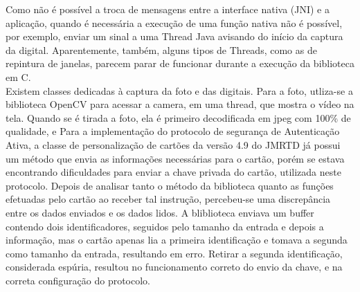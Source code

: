 \documentclass{article}
\begin{document}
\begin{justify}
		\hspace*{2cm}Como não é possível a troca de mensagens entre a interface nativa (JNI) e a aplicação, quando é necessária a execução de uma função nativa não é possível, por exemplo, enviar um sinal a uma Thread Java avisando do início da captura da digital. Aparentemente, também, alguns tipos de Threads, como as de repintura de janelas, parecem parar de funcionar durante a execução da biblioteca em C.\\
		\hspace*{2cm}Existem classes dedicadas à captura da foto e das digitais. Para a foto, utliza-se a biblioteca OpenCV para acessar a camera, em uma thread, que mostra o vídeo na tela. Quando se é tirada a foto, ela é primeiro decodificada em jpeg com 100\% de qualidade, e 
		\hspace*{2cm}Para a implementação do protocolo de segurança de Autenticação Ativa, a classe de personalização de cartões da versão 4.9 do JMRTD já possui um método que envia as informações necessárias para o cartão, porém se estava encontrando dificuldades para enviar a chave privada do cartão, utilizada neste protocolo. Depois de analisar tanto o método da biblioteca quanto as funções efetuadas pelo cartão ao receber tal instrução, percebeu-se uma discrepância entre os dados enviados e os dados lidos. A bliblioteca enviava um buffer contendo dois identificadores, seguidos pelo tamanho da entrada e depois a informação, mas o cartão apenas lia a primeira identificação e tomava a segunda como tamanho da entrada, resultando em erro. Retirar a segunda identificação, considerada espúria, resultou no funcionamento correto do envio da chave, e na correta configuração do protocolo.


		\end{justify}
\end{document}
